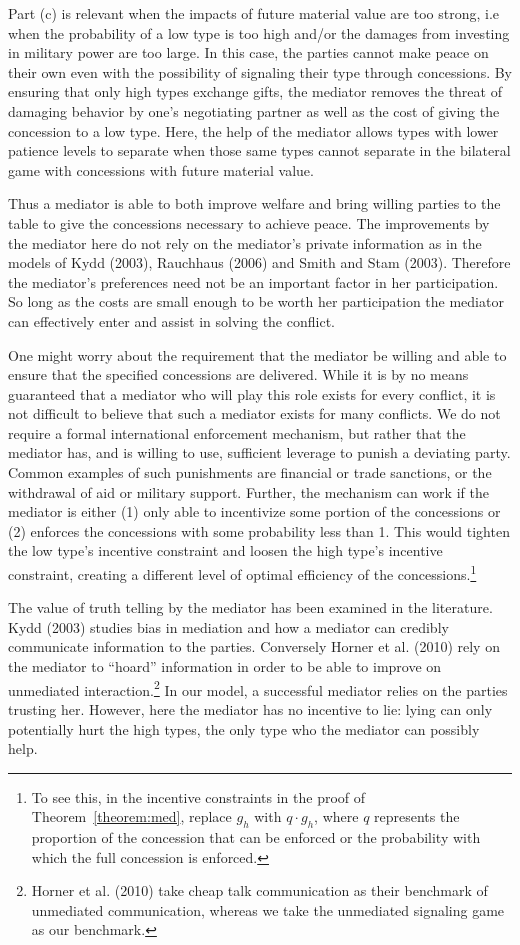 \documentclass[12pt, letterpaper]{article}
\begin{document}
Part (c) is relevant when the impacts of future material value are too strong, i.e when the probability of a low type is too high and/or the damages from investing in military power are too large. In this case, the parties cannot make peace on their own even with the possibility of signaling their type through concessions. By ensuring that only high types exchange gifts, the mediator removes the threat of damaging behavior by one's negotiating partner as well as the cost of giving the concession to a low type. Here, the help of the mediator allows types with lower patience levels to separate when those same types cannot separate in the bilateral game with concessions with future material value.

Thus a mediator is able to both improve welfare and bring willing parties to the table to give the concessions necessary to achieve peace. The improvements by the mediator here do not rely on the mediator's private information as in the models of Kydd (2003), Rauchhaus (2006) and Smith and Stam (2003). Therefore the mediator's preferences need not be an important factor in her participation. So long as the costs are small enough to be worth her participation the mediator can effectively enter and assist in solving the conflict.

One might worry about the requirement that the mediator be willing and able to ensure that the specified concessions are delivered. While it is by no means guaranteed that a mediator who will play this role exists for every conflict, it is not difficult to believe that such a mediator exists for many conflicts. We do not require a formal international enforcement mechanism, but rather that the mediator has, and is willing to use, sufficient leverage to punish a deviating party. Common examples of such punishments are financial or trade sanctions, or the withdrawal of aid or military support. Further, the mechanism can work if the mediator is either (1) only able to incentivize some portion of the concessions or (2) enforces the concessions with some probability less than 1. This would tighten the low type's incentive constraint and loosen the high type's incentive constraint, creating a different level of optimal efficiency of the concessions.\footnote{To see this, in the incentive constraints in the proof of Theorem~\ref{theorem:med}, replace $g_h$ with $q \cdot g_h$, where $q$ represents the proportion of the concession that can be enforced or the probability with which the full concession is enforced.} 

The value of truth telling by the mediator has been examined in the literature. Kydd (2003) studies bias in mediation and how a mediator can credibly communicate information to the parties. Conversely Horner et al. (2010) rely on the mediator to ``hoard'' information in order to be able to improve on unmediated interaction.\footnote{Horner et al. (2010) take cheap talk communication as their benchmark of unmediated communication, whereas we take the unmediated signaling game as our benchmark.} In our model, a successful mediator relies on the parties trusting her. However, here the mediator has no incentive to lie: lying can only potentially hurt the high types, the only type who the mediator can possibly help.
\end{document}
